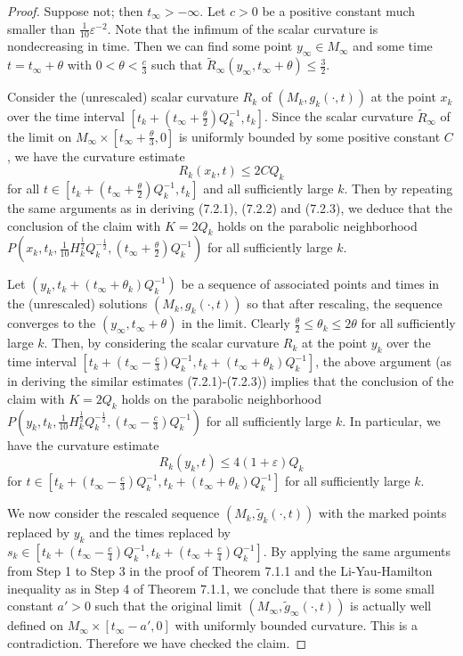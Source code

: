 \begin{proof}
Suppose not; then $t_{\infty} > -\infty.$ Let $c>0$ be a positive
constant much smaller than $\frac{1}{10}\varepsilon^{-2}$. Note
that the infimum of the scalar curvature is nondecreasing in time.
Then we can find some point $y_{\infty} \in M_{\infty}$ and some
time $t=t_{\infty} + \theta$ with $0<\theta<\frac{c}{3}$ such that
$\tilde{R}_{\infty}(y_{\infty},t_{\infty}+\theta) \leq
\frac{3}{2}$.

Consider the (unrescaled) scalar curvature $R_k$ of
$(M_k,{g}_k(\cdot,t))$ at the point $x_k$ over the time interval
$[t_k+(t_{\infty}+\frac{\theta}{2})Q_k^{-1},t_k]$. Since the
scalar curvature $\tilde{R}_{\infty}$ of the limit on
$M_{\infty}\times [t_{\infty}+\frac{\theta}{3},0]$ is uniformly
bounded by some positive constant $C$, we have the curvature
estimate $$R_k(x_k,t) \leq 2CQ_k$$ for all $t \in
[t_k+(t_{\infty}+\frac{\theta}{2})Q_k^{-1},t_k]$ and all
sufficiently large $k$. Then by repeating the same arguments as in
deriving (7.2.1), (7.2.2) and (7.2.3), we deduce that the
conclusion of the claim with $K=2Q_k$ holds on the parabolic
neighborhood
$P(x_k,t_k,\frac{1}{10}H_k^{\frac{1}{2}}Q_k^{-\frac{1}{2}},
(t_{\infty}+\frac{\theta}{2})Q_k^{-1})$ for all sufficiently large
$k$.

Let $(y_k,t_k+(t_{\infty}+\theta_k)Q_k^{-1})$ be a sequence of
associated points and times in the (unrescaled) solutions
$(M_k,g_k(\cdot,t))$ so that after rescaling, the sequence
converges to the $(y_{\infty},t_{\infty}+\theta)$ in the limit.
Clearly $\frac{\theta}{2}\leq \theta_k \leq 2\theta$ for all
sufficiently large $k$. Then, by considering the scalar curvature
$R_k$ at the point $y_k$ over the time interval
$[t_k+(t_{\infty}-\frac{c}{3})Q_k^{-1},t_k+(t_{\infty}+\theta_k)Q_k^{-1}]$,
the above argument (as in deriving the similar estimates
(7.2.1)-(7.2.3)) implies that the conclusion of the claim with
$K=2Q_k$ holds on the parabolic neighborhood
$P(y_k,t_k,\frac{1}{10}H_k^{\frac{1}{2}}Q_k^{-\frac{1}{2}},
(t_{\infty}-\frac{c}{3})Q_k^{-1})$ for all sufficiently large $k$.
In particular, we have the curvature estimate
$$
R_k(y_k,t) \leq 4(1+\varepsilon)Q_k
$$
for $t \in [t_k+(t_{\infty}-\frac{c}{3})Q_k^{-1},
t_k+(t_{\infty}+\theta_k)Q_k^{-1}]$ for all sufficiently large
$k$.

We now consider the rescaled sequence $(M_k,\tilde{g}_k(\cdot,t))$
with the marked points replaced by $y_k$ and the times replaced by
$s_k \in [t_k+(t_{\infty}-\frac{c}{4})Q_k^{-1},
t_k+(t_{\infty}+\frac{c}{4})Q_k^{-1}]$. By applying the same
arguments from Step 1 to Step 3 in the proof of Theorem 7.1.1 and
the Li-Yau-Hamilton inequality as in Step 4 of Theorem 7.1.1, we
conclude that there is some small constant $a'>0$ such that the
original limit $(M_{\infty},\tilde{g}_{\infty}(\cdot,t))$ is
actually well defined on $M_{\infty} \times [t_{\infty}-a',0]$
with uniformly bounded curvature. This is a contradiction.
Therefore we have checked the claim.
\end{proof}

